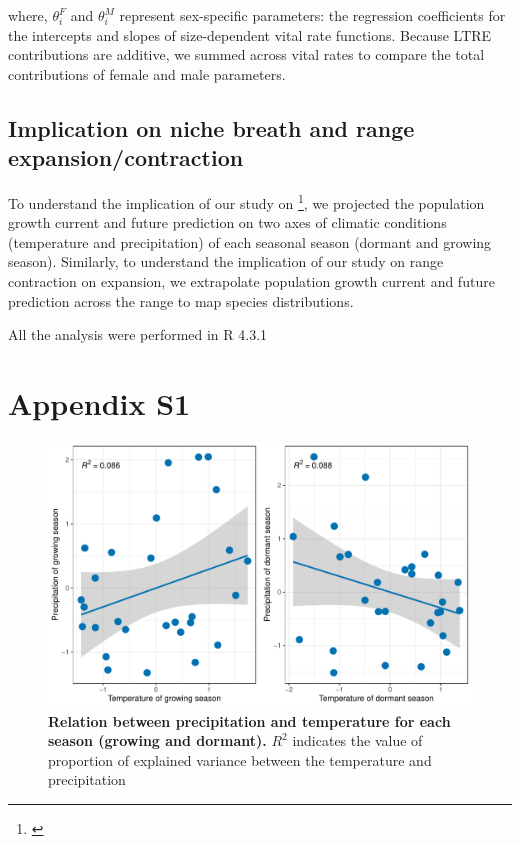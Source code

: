 \documentclass[11pt]{article}
\newcommand{\tom}[2]{{\color{red}{#1}}\footnote{\textit{\color{red}{#2}}}}
\begin{document}
{\noindent where, $\theta^{F}_{i}$ and $\theta^{M}_{i}$ represent sex-specific parameters: the regression coefficients for the intercepts and slopes of size-dependent vital rate functions. 
Because LTRE contributions are additive, we summed across vital rates to compare the total contributions of female and male parameters. 

\subsection*{Implication on niche breath and range expansion/contraction}
To understand the implication of our study on \tom{niche breath}{You have not defined this, or described how it relates to geographic ranges.}, we projected the population growth current and future prediction on two axes of climatic conditions (temperature and precipitation) of each seasonal season (dormant and growing season). 
Similarly, to understand the implication of our study on range contraction on expansion, we extrapolate population growth current and future prediction across the range to map species distributions. 

All the analysis were performed in R 4.3.1 \citep{RCoreteam}


\section*{Appendix S1}
\renewcommand{\thefigure}{S\arabic{figure}}
	\setcounter{figure}{0}
	
		\renewcommand{\thetable}{S\arabic{table}}
	\setcounter{equation}{0}  %
	\setcounter{figure}{0}
	\setcounter{table}{0}
	
	
	\begin{figure}[H]
		\centering
		\includegraphics[width = \linewidth]{Figures/Varianceexplained.pdf}
		\caption{\textbf{Relation between precipitation and temperature for each season (growing and dormant).} $R^2$ indicates the value of proportion of explained variance between the temperature and precipitation}
	\end{figure}
	
}
\end{document}
